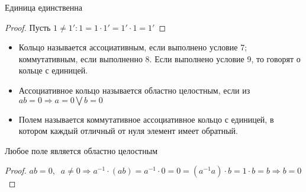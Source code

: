\begin{proposition}
Единица единственна
\end{proposition}
\begin{proof}
Пусть $1\neq1': 1=1\cdot 1'=1'\cdot 1=1'$
\end{proof}
\begin{itemize}
    \item Кольцо называется ассоциативным, если выполнено условие 7; коммутативным, если выполненно 8. Если выполнено условие 9, то говорят о кольце с единицей.
    \item Ассоциативное кольцо называется областно целостным, если из $ab=0\Rightarrow a=0\bigvee b=0$
    \item Полем называется коммутативное ассоциативное кольцо с единицей, в котором каждый отличный от нуля элемент имеет обратный. 
    
\end{itemize}
\begin{proposition}
Любое поле является областно целостным
\end{proposition}
\begin{proof}
$ab=0, \;\;a \neq 0 \Rightarrow a^{-1} \cdot (ab)=a^{-1} \cdot 0=0=(a^{-1}a) \cdot b=1 \cdot b =b \Rightarrow b=0$
\end{proof}
